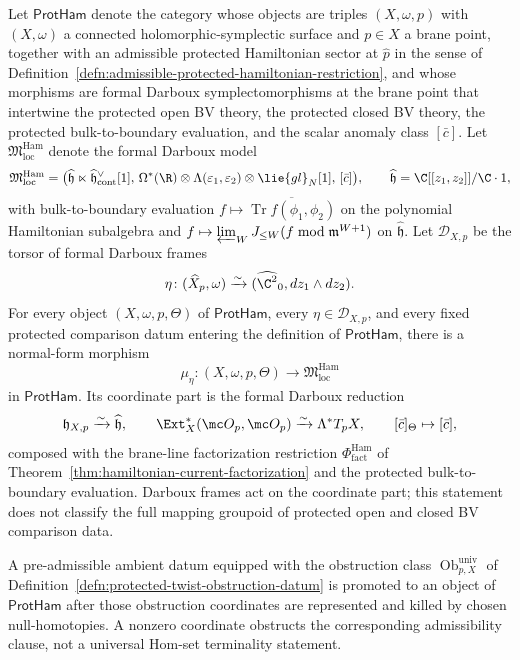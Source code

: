 \begin{thm}\label{thm:formal-local-universal-property}
  Let \(\mathsf{ProtHam}\) denote the category whose objects are
  triples \((X,\omega,p)\) with \((X,\omega)\) a connected
  holomorphic-symplectic surface and \(p\in X\) a brane point,
  together with an admissible protected Hamiltonian sector at
  \(\widehat p\) in the sense of
  Definition~\ref{defn:admissible-protected-hamiltonian-restriction},
  and whose morphisms are formal Darboux symplectomorphisms at the
  brane point that intertwine the protected open BV theory, the
  protected closed BV theory, the protected bulk-to-boundary
  evaluation, and the scalar anomaly class \([\bar c]\).  Let
  \(\mathfrak M^{\mathrm{Ham}}_{\mathrm{loc}}\) denote the formal
  Darboux model
  \[
    \mathfrak M^{\mathrm{Ham}}_{\mathrm{loc}}
     =
    \bigl(
      \widehat{\mathfrak h}\ltimes
      \widehat{\mathfrak h}^\vee_{\mathrm{cont}}[1],
      \,
      \Omega^*(\R)\otimes\Lambda(\varepsilon_1,\varepsilon_2)
        \otimes\lie{gl}_N[1],
      \,
      [\bar c]
    \bigr),
    \qquad
    \widehat{\mathfrak h}=\C[[z_1,z_2]]/\C\cdot1,
  \]
  with bulk-to-boundary evaluation
  \(f\mapsto\overline{\operatorname{Tr}f(\phi_1,\phi_2)}\) on the
  polynomial Hamiltonian subalgebra and
  \(f\mapsto\varprojlim_WJ_{\leq W}(f\bmod\mathfrak m^{W+1})\) on
  \(\widehat{\mathfrak h}\).  Let \(\mathcal D_{X,p}\) be the torsor of formal
  Darboux frames
  \[
    \eta\colon(\widehat X_p,\omega)\xrightarrow{\sim}
    (\widehat{\C^2}_0,dz_1\wedge dz_2).
  \]
  For every object \((X,\omega,p,\Theta)\) of \(\mathsf{ProtHam}\),
  every \(\eta\in\mathcal D_{X,p}\), and every fixed protected
  comparison datum entering the definition of \(\mathsf{ProtHam}\),
  there is a normal-form morphism
  \[
    \mu_\eta\colon
    (X,\omega,p,\Theta)\longrightarrow
      \mathfrak M^{\mathrm{Ham}}_{\mathrm{loc}}
  \]
  in \(\mathsf{ProtHam}\).  Its coordinate part is the formal Darboux reduction
  \[
    \mathfrak h_{X,p}\xrightarrow{\sim}\widehat{\mathfrak h},\qquad
    \Ext^*_X(\mc O_p,\mc O_p)\xrightarrow{\sim}\Lambda^*T_pX,\qquad
    [\bar c]_\Theta\mapsto[\bar c],
  \]
  composed with the brane-line factorization restriction
  \(\Phi^{\mathrm{Ham}}_{\mathrm{fact}}\) of
  Theorem~\ref{thm:hamiltonian-current-factorization} and the
  protected bulk-to-boundary evaluation.  Darboux frames act on the
  coordinate part; this statement does not classify the full mapping
  groupoid of protected open and closed BV comparison data.

  A pre-admissible ambient datum equipped with the obstruction class
  \(\operatorname{Ob}^{\mathrm{univ}}_{p,X}\) of
  Definition~\ref{defn:protected-twist-obstruction-datum} is promoted
  to an object of \(\mathsf{ProtHam}\) after those obstruction
  coordinates are represented and killed by chosen null-homotopies.
  A nonzero coordinate obstructs the corresponding admissibility
  clause, not a universal Hom-set terminality statement.
\end{thm}

